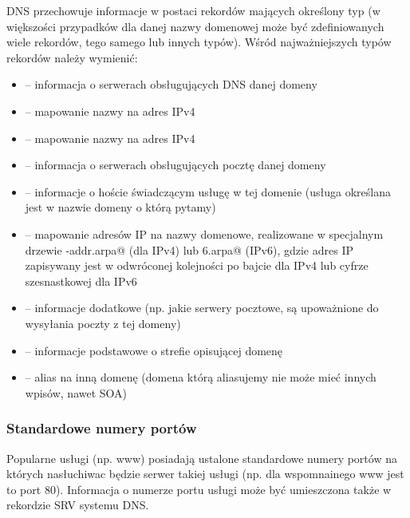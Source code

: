 DNS przechowuje informacje w postaci rekordów mających określony typ (w większości przypadków dla danej nazwy domenowej może być zdefiniowanych wiele rekordów, tego samego lub innych typów).
Wśród najważniejszych typów rekordów należy wymienić:
\begin{itemize}
	\item \Verb@NS@    – informacja o serwerach obsługujących DNS danej domeny
	\item \Verb@A@     – mapowanie nazwy na adres IPv4
	\item \Verb@AAAA@  – mapowanie nazwy na adres IPv4
	\item \Verb@MX@    – informacja o serwerach obsługujących pocztę danej domeny
	\item \Verb@SRV@   – informacje o hoście świadczącym usługę w tej domenie (usługa określana jest w nazwie domeny o którą pytamy)
	\item \Verb@PTR@   – mapowanie adresów IP na nazwy domenowe, realizowane w specjalnym drzewie \Verb@in-addr.arpa@ (dla IPv4) lub \Verb@ip6.arpa@ (IPv6),
	                     gdzie adres IP zapisywany jest w odwróconej kolejności po bajcie dla IPv4 lub cyfrze szesnastkowej dla IPv6
	\item \Verb@TXT@   – informacje dodatkowe (np. jakie serwery pocztowe, są upoważnione do wysyłania poczty z tej domeny)
	\item \Verb@SOA@   – informacje podstawowe o strefie opisującej domenę
	\item \Verb@CNAME@ – alias na inną domenę (domena którą aliasujemy nie może mieć innych wpisów, nawet SOA)
\end{itemize}

\subsubsection{Standardowe numery portów}

Popularne usługi (np. www) posiadają ustalone standardowe numery portów na których nasłuchiwac będzie serwer takiej usługi (np. dla wspomnainego www jest to port 80). Informacja o numerze portu usługi może być umieszczona także w rekordzie SRV systemu DNS.
